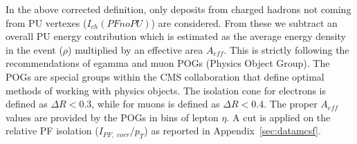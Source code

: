 In the above corrected definition, only deposits from charged hadrons not coming from PU vertexes ($I_{ch}(PFnoPU)$) are considered.  From these we subtract an overall PU energy contribution which is estimated as the average energy density in the event ($\rho$) multiplied by an effective area $A_{eff}$. This is strictly following the recommendations of egamma and muon POGs (Physics Object Group). The POGs are special groups within the CMS collaboration that define optimal methods of working with physics objects. The isolation cone for electrons is defined as $\Delta R < 0.3$, while for muons is defined as $\Delta R < 0.4$. The proper $A_{eff}$ values are provided by the POGs in bins of lepton $\eta$. A cut is applied on the relative PF isolation ($I_{PF, \,\, corr} / p_T$) as reported in Appendix~\ref{sec:datamcsf}.





